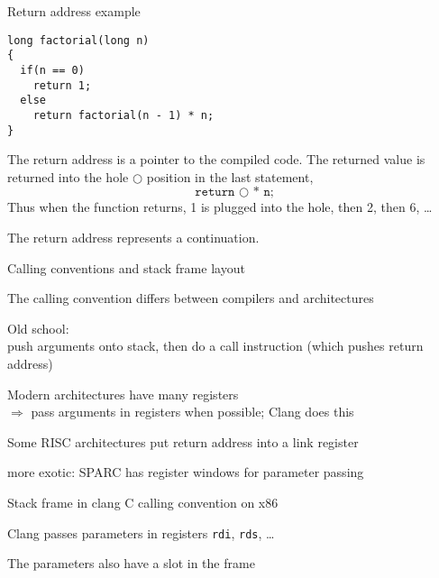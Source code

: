 \documentclass[landscape]{beamer}
\begin{document}
\begin{frame}[fragile]{Return address example}

\begin{verbatim}
long factorial(long n)
{
  if(n == 0)
    return 1;
  else
    return factorial(n - 1) * n;
}
\end{verbatim}

The return address is a pointer to the compiled code. The returned value is returned into the hole $\bigcirc$ position in the last statement,
\[
\texttt{return $\bigcirc$ * n;}
\]
Thus when the function returns, 1 is plugged into the hole, then 2, then 6, \ldots

The return address represents a continuation.
\end{frame}

\begin{frame}{Calling conventions and stack frame layout}

The calling convention differs between compilers and architectures

Old school: 
\\push arguments onto stack, then do a call instruction (which pushes return address)

Modern architectures have many registers
\\
$\Rightarrow$ pass arguments in registers when possible; Clang does this

Some RISC architectures put return address into a link register

more exotic: SPARC has register windows for parameter passing
\end{frame}


\begin{frame}[fragile]{Stack frame in clang C calling convention on x86}

Clang \alert{passes parameters in registers} \texttt{rdi}, \texttt{rds}, \ldots

The parameters \alert{also have a slot in the frame}

  
\end{frame} 
\end{document}
